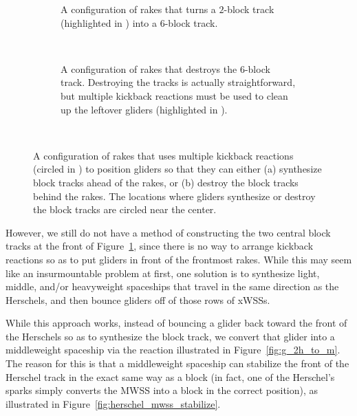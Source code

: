 \begin{figure}[!htbp]
	\centering
	\begin{subfigure}{\textwidth}
		\centering
		\caption{A configuration of rakes that turns a $2$-block track (highlighted in ) into a $6$-block track.}\label{fig:31c_240_track_builder}
	\end{subfigure} \\[0.2cm]
	\begin{subfigure}{\textwidth}
		\centering
		\caption{A configuration of rakes that destroys the $6$-block track. Destroying the tracks is actually straightforward, but multiple kickback reactions must be used to clean up the leftover gliders (highlighted in ).}\label{fig:31c_240_track_destroyer}
	\end{subfigure} \\
	\caption{A configuration of rakes that uses multiple kickback reactions (circled in ) to position gliders so that they can either (a) synthesize block tracks ahead of the rakes, or (b) destroy the block tracks behind the rakes. The locations where gliders synthesize or destroy the block tracks are circled near the center.}\label{fig:31c_240_builder_destroyer}
\end{figure}

However, we still do not have a method of constructing the two central block tracks at the front of Figure~\ref{fig:31c_240_track_builder}, since there is no way to arrange kickback reactions so as to put gliders in front of the frontmost rakes. While this may seem like an insurmountable problem at first, one solution is to synthesize light, middle, and/or heavyweight spaceships that travel in the same direction as the Herschels, and then bounce gliders off of those rows of xWSSs.

While this approach works, instead of bouncing a glider back toward the front of the Herschels so as to synthesize the block track, we convert that glider into a middleweight spaceship via the reaction illustrated in Figure~\ref{fig:g_2h_to_m}. The reason for this is that a middleweight spaceship can stabilize the front of the Herschel track in the exact same way as a block (in fact, one of the Herschel's sparks simply converts the MWSS into a block in the correct position), as illustrated in Figure~\ref{fig:herschel_mwss_stabilize}.

